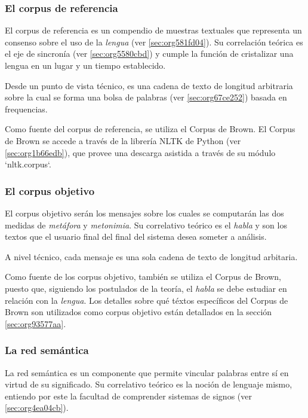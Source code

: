 \documentclass[12pt,letterpaper,twoside]{article}
\begin{document}
\subsubsection{El corpus de referencia}
\label{sec:orgf44e52a}

El corpus de referencia es un compendio de muestras textuales que
representa un consenso sobre el uso de la \emph{lengua} (ver
\ref{sec:org581fd04}). Su correlación teórica es el eje de sincronía (ver
\ref{sec:org5580cbd}) y cumple la función de cristalizar una
lengua en un lugar y un tiempo establecido.

Desde un punto de vista técnico, es una cadena de texto de
longitud arbitraria sobre la cual se forma una bolsa de palabras
(ver \ref{sec:org67ce252}) basada en frequencias.

Como fuente del corpus de referencia, se utiliza el Corpus de
Brown. El Corpus de Brown se accede a través de la librería NLTK
de Python (ver \ref{sec:org1b66edb}), que provee una descarga asistida a través
de su módulo `nltk.corpus`.


\subsubsection{El corpus objetivo}
\label{sec:orgebbd867}

El corpus objetivo serán los mensajes sobre los cuales se
computarán las dos medidas de \emph{metáfora} y \emph{metonimia}.  Su
correlativo teórico es el \emph{habla} y son los textos que el usuario
final del final del sistema desea someter a análisis.

A nivel técnico, cada mensaje es una sola cadena de texto de
longitud arbitaria.

Como fuente de los corpus objetivo, también se utiliza el Corpus
de Brown, puesto que, siguiendo los postulados de la teoría, el
\emph{habla} se debe estudiar en relación con la \emph{lengua}. Los
detalles sobre qué téxtos específicos del Corpus de Brown son
utilizados como corpus objetivo están detallados en la sección
\ref{sec:org93577aa}.



\subsubsection{La red semántica}
\label{sec:org0368738}

La red semántica es un componente que permite vincular palabras
entre sí en virtud de su significado. Su correlativo teórico
es la noción de lenguaje mismo, entiendo por este la facultad
de comprender sistemas de signos (ver \ref{sec:org4ea04cb}).
\end{document}
